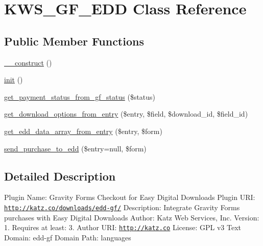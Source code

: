 \hypertarget{class_k_w_s___g_f___e_d_d}{\section{K\-W\-S\-\_\-\-G\-F\-\_\-\-E\-D\-D Class Reference}
\label{class_k_w_s___g_f___e_d_d}
}
\subsection*{Public Member Functions}
\begin{DoxyCompactItemize}
\item 
\hyperlink{class_k_w_s___g_f___e_d_d_a285db2e0469dc1da689cf4554f7b4ac7}{\-\_\-\-\_\-construct} ()
\item 
\hyperlink{class_k_w_s___g_f___e_d_d_a4d58c6b349b4a2dd52d509efb3300adc}{init} ()
\item 
\hyperlink{class_k_w_s___g_f___e_d_d_aa718a24cb749c979ed56e798a7e9ae52}{get\-\_\-payment\-\_\-status\-\_\-from\-\_\-gf\-\_\-status} (\$status)
\item 
\hyperlink{class_k_w_s___g_f___e_d_d_a988bc1f1b9b53450e5df93c031e5e4cf}{get\-\_\-download\-\_\-options\-\_\-from\-\_\-entry} (\$entry, \$field, \$download\-\_\-id, \$field\-\_\-id)
\item 
\hyperlink{class_k_w_s___g_f___e_d_d_a957f6050e92f37a0c11d9350a32accdd}{get\-\_\-edd\-\_\-data\-\_\-array\-\_\-from\-\_\-entry} (\$entry, \$form)
\item 
\hyperlink{class_k_w_s___g_f___e_d_d_a9b3c8c5490e780bed64e4ccbe9ce913c}{send\-\_\-purchase\-\_\-to\-\_\-edd} (\$entry=null, \$form)
\end{DoxyCompactItemize}


\subsection{Detailed Description}
Plugin Name\-: Gravity Forms Checkout for Easy Digital Downloads Plugin U\-R\-I\-: \href{http://katz.co/downloads/edd-gf/}{\tt http\-://katz.\-co/downloads/edd-\/gf/} Description\-: Integrate Gravity Forms purchases with Easy Digital Downloads Author\-: Katz Web Services, Inc. Version\-: 1. Requires at least\-: 3. Author U\-R\-I\-: \href{http://katz.co}{\tt http\-://katz.\-co} License\-: G\-P\-L v3 Text Domain\-: edd-\/gf Domain Path\-: languages 

